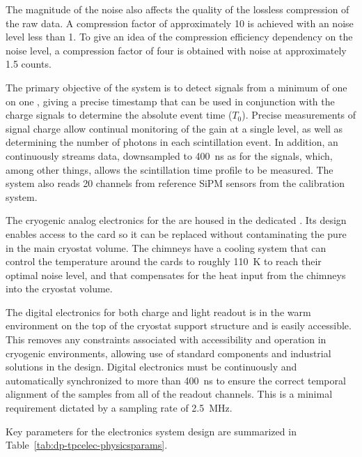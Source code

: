 The magnitude of the noise also affects the quality of the lossless compression of the raw data. A compression factor of approximately \num{10} is achieved with an \rms noise level less than \SI{1}{}. To give an idea of the compression efficiency dependency on the noise level, a compression factor of four is obtained with noise at approximately \SI{1.5}{} counts. 

The primary objective of the  system is to detect signals from a minimum of one \phel on one , giving a precise timestamp that can be used in conjunction with the charge signals to determine the absolute event time ($T_0$). Precise measurements of  signal charge allow  continual monitoring of the  gain at a single \phel level, as well as determining the number of photons in each scintillation event.  In addition, an   continuously streams data, downsampled to \SI{400}{ns} as for the  signals,  which, among other things, allows the scintillation time profile to be measured. The  system also reads \num{20} channels from reference SiPM sensors from the  calibration system.


The cryogenic analog electronics for the  are housed in the dedicated . Its design enables access to the  card so it can be replaced without contaminating the pure \lar in the main cryostat volume. The chimneys have a cooling system that can control the temperature around the  cards to roughly \SI{110}{\kelvin} to reach their optimal noise level, and that compensates for the heat input from the chimneys into the cryostat volume. 

The digital electronics for both charge and light readout is in the warm environment on the top of the cryostat support structure and is easily accessible. This removes any constraints associated with  accessibility and operation in cryogenic environments, allowing use of standard components and industrial solutions in the design. Digital electronics must be continuously and automatically synchronized to more than \SI{400}{\nano\s} to ensure the correct temporal alignment of the  samples from all of the readout channels. This is a minimal requirement dictated by a sampling rate of \SI{2.5}{\MHz}.  

 Key parameters for the electronics system design are summarized in Table~\ref{tab:dp-tpcelec-physicsparams}. 

